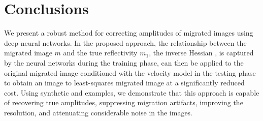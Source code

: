 \section{Conclusions}
\hspace{\parindent} We present a robust method for correcting amplitudes of migrated images using deep neural networks. In the proposed approach, the relationship between the migrated image $m$ and the true reflectivity $m_1$, the inverse Hessian , is captured by the neural networks during the training phase,  can then be applied to the original migrated image conditioned with the velocity model in the testing phase to obtain an image  to  least-squares migrated image  at a significantly reduced cost. Using  synthetic and  examples, we demonstrate that this approach is capable of recovering true amplitudes, suppressing migration artifacts, improving the resolution, and attenuating considerable noise in the images. %



\newpage
\onecolumn



